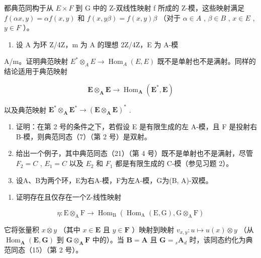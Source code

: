 都典范同构于从 \(E \times F\) 到 G 中的 Z-双线性映射 f 所成的 Z-模，这些映射满足 \(f(\alpha x, y) = \alpha f(x, y)\) 和 \(f(x, y\beta) = f(x, y)\beta\) （对于 \(\alpha \in A\) , \(\beta \in B\) , \(x \in E\) , \(y \in F\) ）。

\begin{enumerate}
\def\labelenumi{\arabic{enumi}.}
\setcounter{enumi}{1}
\tightlist
\item
  设 A 为环 Z/4Z，m 为 A 的理想 2Z/4Z，E 为 A-模
\end{enumerate}

A/m。证明典范映射 \(E^{*} \otimes_{A} E \to \operatorname{Hom}_{A}(E, E)\) 既不是单射也不是满射。同样的结论适用于典范映射

\[
\mathbf {E} \otimes_ {\mathbf {A}} \mathbf {E} \rightarrow \operatorname{Hom} _ {\mathbf {A}} (\mathbf {E} ^ {*}, \mathbf {E})
\]

以及典范映射 \(\mathbf{E}^{*}\otimes_{\mathbf{A}}\mathbf{E}^{*}\to (\mathbf{E}\otimes_{\mathbf{A}}\mathbf{E})^{*}\) .

\begin{enumerate}
\def\labelenumi{\arabic{enumi}.}
\setcounter{enumi}{2}
\item
  证明：在第 2 号的条件之下，若假设 E 是有限生成的左 A-模，且 F 是投射右 B-模，则典范同态（7）（第 2 号）是双射。
\item
  给出一个例子，其中典范同态（21）（第 4 号）既不是单射也不是满射，尽管 \(F_{2} = C\) , \(E_{1} = C\) 以及 \(E_{2}\) 和 \(F_{1}\) 都是有限生成的 C-模（参见习题 2）。
\item
  设A、B为两个环，E为右A-模，F为左A-模，G为(B, A)-双模。
\end{enumerate}

\begin{enumerate}
\def\labelenumi{(\alph{enumi})}
\tightlist
\item
  证明存在且仅存在一个Z-线性映射
\end{enumerate}

\[
\eta : \mathrm{E} \otimes_ {\mathrm{A}} \mathrm{F} \rightarrow \operatorname{Hom} _ {\mathrm{B}} (\operatorname{Hom} _ {\mathrm{A}} (\mathrm{E}, \mathrm{G}), \mathrm{G} \otimes_ {\mathrm{A}} \mathrm{F})
\]

它将张量积 \(x \otimes y\) （其中 \(x \in \mathbf{E}\) 且 \(y \in \mathbf{F}\) ）映射到映射 \(v_{x,y}: u \mapsto u(x) \otimes y\) （从 \(\operatorname{Hom}_{\mathbf{A}}(\mathbf{E}, \mathbf{G})\) 到 \(\mathbf{G} \otimes_{\mathbf{A}} \mathbf{F}\) 中的）。当 \(\mathbf{B} = \mathbf{A}\) 且 \(\mathbf{G} = {}_s\mathbf{A}_d\) 时，该同态约化为典范同态（15）（第 2 号）。

